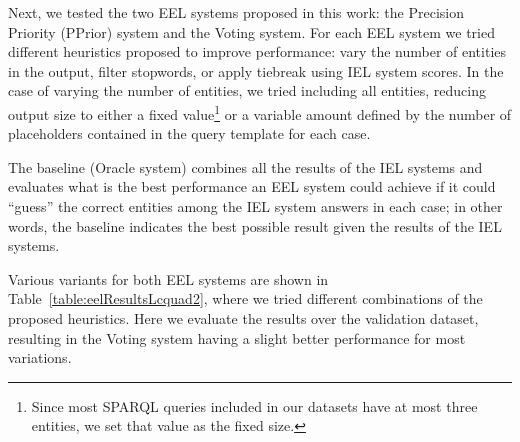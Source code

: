 Next, we tested the two EEL systems proposed in this work: the Precision Priority (PPrior) system 
and the Voting system. For each EEL system we tried different heuristics proposed to improve 
performance: vary the number of entities in the output, filter stopwords, or apply tiebreak using 
IEL system scores. In the case of varying the number of entities, we tried including all entities, 
reducing output size to either a fixed value\footnote{Since most SPARQL queries included in our 
datasets have at most three entities, we set that value as the fixed size. } or a variable amount 
defined by the number of placeholders contained in the query template for each case. 

The baseline (Oracle system) combines all the results of the IEL systems and evaluates what is 
the best performance an EEL system could achieve if it could “guess” the correct entities among 
the IEL system answers in each case; in other words, the baseline indicates the best possible 
result given the results of the IEL systems. 

Various variants for both EEL systems are shown in Table~\ref{table:eelResultsLcquad2}, where we 
tried different combinations of the proposed heuristics. Here we evaluate the results over the 
\LCQuADtwo{} validation dataset, resulting in the Voting system having a slight better performance 
for most variations. 

